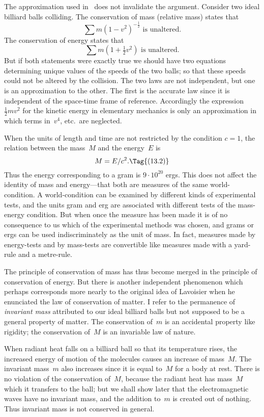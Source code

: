 \documentclass[12pt]{book}
\begin{document}
The approximation used in~ does not invalidate the argument.
Consider two ideal billiard balls colliding. The conservation of mass (relative
%
mass) states that
\[
\sum m (1 - v^2)^{-\frac{1}{2}} \text{ is unaltered.}
\]
The conservation of energy states that
\[
\sum m (1 + \tfrac{1}{2}v^2) \text{ is unaltered.}
\]
But if both statements were exactly true we should have two equations
determining unique values of the speeds of the two balls; so that these speeds
could not be altered by the collision. The two laws are not independent, but
one is an approximation to the other. The first is the accurate law since it is
independent of the space-time frame of reference. Accordingly the expression
$\frac{1}{2}mv^2$ for the kinetic energy in elementary mechanics is only an approximation
in which terms in~$v^{4}$, etc.\ are neglected.

When the units of length and time are not restricted by the condition
$c = 1$, the relation between the mass~$M$ and the energy~$E$ is
\[
M = E/c^2.
\Tag{(13.2)}
\]
Thus the energy corresponding to a gram is $9 \cdot 10^{20}$ ergs. This does not
affect the identity of mass and energy---that both are measures of the same
world\hyp{}condition. A world\hyp{}condition can be examined by different kinds of
experimental tests, and the units gram and erg are associated with different
tests of the mass\hyp{}energy condition. But when once the measure has been
made it is of no consequence to us which of the experimental methods was
chosen, and grams or ergs can be used indiscriminately as the unit of mass.
In fact, measures made by energy\hyp{}tests and by mass-tests are convertible like
measures made with a yard-rule and a metre-rule.

The principle of conservation of mass has thus become merged in the
principle of conservation of energy. But there is another independent phenomenon
which perhaps corresponds more nearly to the original idea of Lavoisier
when he enunciated the law of conservation of matter. I refer to the permanence
of \emph{invariant mass} attributed to our ideal billiard balls but not
supposed to be a general property of matter. The conservation of~$m$ is an
%
%
accidental property like rigidity; the conservation of~$M$ is an invariable law
of nature.

When radiant heat falls on a billiard ball so that its temperature rises,
the increased energy of motion of the molecules causes an increase of mass~$M$.
The invariant mass~$m$ also increases since it is equal to~$M$ for a body at rest.
There is no violation of the conservation of~$M$, because the radiant heat has
mass~$M$ which it transfers to the ball; but we shall show later that the
electromagnetic waves have no invariant mass, and the addition to~$m$ is
created out of nothing. Thus invariant mass is not conserved in general.
\end{document}
